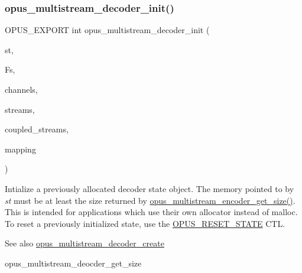 \subsubsection{\texorpdfstring{opus\+\_\+multistream\+\_\+decoder\+\_\+init()}{opus\_multistream\_decoder\_init()}}
{\footnotesize\ttfamily O\+P\+U\+S\+\_\+\+E\+X\+P\+O\+RT int opus\+\_\+multistream\+\_\+decoder\+\_\+init (\begin{DoxyParamCaption}\item[{\hyperlink{group__opus__multistream_gad3497495deb9a8ace82e76cd4f93e0e4}{Opus\+M\+S\+Decoder} $\ast$}]{st,  }\item[{\hyperlink{opus__types_8h_aa4d309d6f80b99dbabebc8f98879ab9a}{opus\+\_\+int32}}]{Fs,  }\item[{int}]{channels,  }\item[{int}]{streams,  }\item[{int}]{coupled\+\_\+streams,  }\item[{\hyperlink{zconf_8h_a2c212835823e3c54a8ab6d95c652660e}{const} unsigned char $\ast$}]{mapping }\end{DoxyParamCaption})}

Intialize a previously allocated decoder state object. The memory pointed to by {\itshape st} must be at least the size returned by \hyperlink{group__opus__multistream_ga598e82225e53af23017e0c96f4eaf3b4}{opus\+\_\+multistream\+\_\+encoder\+\_\+get\+\_\+size()}. This is intended for applications which use their own allocator instead of malloc. To reset a previously initialized state, use the \hyperlink{group__opus__genericctls_gadc74e4fa8bcdf9994187d52d92207337}{O\+P\+U\+S\+\_\+\+R\+E\+S\+E\+T\+\_\+\+S\+T\+A\+TE} C\+TL. \begin{DoxySeeAlso}{See also}
\hyperlink{group__opus__multistream_ga0dc5378a3d4c65498cf530e450b56aa1}{opus\+\_\+multistream\+\_\+decoder\+\_\+create} 

opus\+\_\+multistream\+\_\+deocder\+\_\+get\+\_\+size 
\end{DoxySeeAlso}

